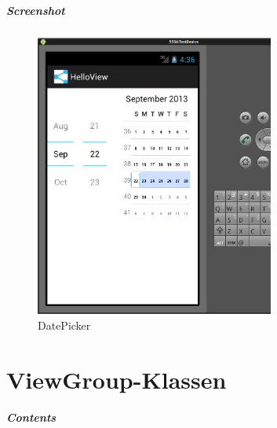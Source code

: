 \begin{frame}
   \frametitle{Screenshot}
   \begin{figure}[h!]
     \centering
     \includegraphics[width=0.7\textwidth]{pictures/datepicker.ps}
     \caption{
        DatePicker
     }
     \label{fig:datepicker}
   \end{figure}
\end{frame}

\part{ViewGroup-Klassen}
\frame{\partpage}
\begin{frame}
	\frametitle{Contents}
	\tableofcontents[]
\end{frame}

